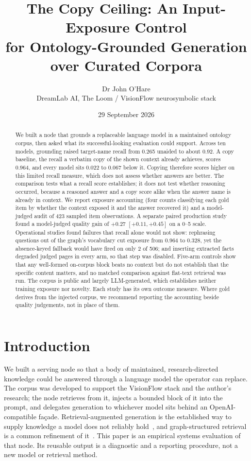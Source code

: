 \documentclass[10pt,twocolumn]{article}
\title{\vspace{-1.2cm}\bfseries The Copy Ceiling: An Input-Exposure Control\\
for Ontology-Grounded Generation over Curated Corpora}
\author{Dr John O'Hare\\ \small DreamLab AI, The Loom / VisionFlow neurosymbolic stack}
\date{29 September 2026}
\begin{document}
\maketitle

\begin{abstract}
\noindent
We built a node that grounds a replaceable language model in a maintained ontology corpus, then asked what its successful-looking evaluation could support. Across ten models, grounding raised target-name recall from 0.265 unaided to about 0.92. A copy baseline, the recall a verbatim copy of the shown context already achieves, scores 0.964, and every model sits 0.022 to 0.067 below it. Copying therefore scores higher on this limited recall measure, which does not assess whether answers are better. The comparison tests what a recall score establishes; it does not test whether reasoning occurred, because a reasoned answer and a copy score alike when the answer name is already in context. We report exposure accounting (four counts classifying each gold item by whether the context exposed it and the answer recovered it) and a model-judged audit of 423 sampled item observations. A separate paired production study found a model-judged quality gain of $+0.27$ $[+0.11,+0.45]$ on a 0--5 scale. Operational studies found failures that recall alone would not show: rephrasing questions out of the graph's vocabulary cut exposure from 0.964 to 0.328, yet the absence-keyed fallback would have fired on only 2 of 506; and inserting extracted facts degraded judged pages in every arm, so that step was disabled. Five-arm controls show that any well-formed on-corpus block beats no context but do not establish that the specific content matters, and no matched comparison against flat-text retrieval was run. The corpus is public and largely LLM-generated, which establishes neither training exposure nor novelty. Each study has its own outcome measure. Where gold derives from the injected corpus, we recommend reporting the accounting beside quality judgements, not in place of them.
\end{abstract}

\section{Introduction}\label{sec:intro}
We built a serving node so that a body of maintained, research-directed knowledge could be answered through a language model the operator can replace. The corpus was developed to support the VisionFlow stack and the author's research; the node retrieves from it, injects a bounded block of it into the prompt, and delegates generation to whichever model sits behind an OpenAI-compatible fa\c{c}ade. Retrieval-augmented generation is the established way to supply knowledge a model does not reliably hold~\cite{lewis2020rag,gao2023ragsurvey,mallen2023trust}, and graph-structured retrieval is a common refinement of it~\cite{edge2024graphrag,guo2024lightrag,baek2023kaping,pan2024unifying}. This paper is an empirical systems evaluation of that node. Its reusable output is a diagnostic and a reporting procedure, not a new model or retrieval method.
\end{document}
